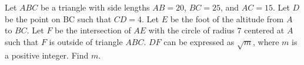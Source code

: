 Let $ABC$ be a triangle with side lengths $AB = 20$, $BC = 25$, and $AC = 15$. Let $D$ be the point on BC such that $CD = 4$. Let $E$ be the foot of the altitude from $A$ to $BC$. Let $F$ be the intersection of $AE$ with the circle of radius $7$ centered at $A$ such that $F$ is outside of triangle $ABC$. $DF$ can be expressed as $\sqrt{m}$, where $m$ is a positive integer. Find $m$.
